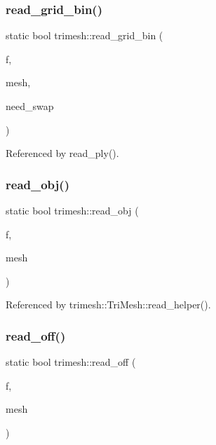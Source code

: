 \mbox{\label{namespacetrimesh_a7a92c66194fd0ddb7aecee23de456f23}} 
\subsubsection{\texorpdfstring{read\+\_\+grid\+\_\+bin()}{read\_grid\_bin()}}
{\footnotesize\ttfamily static bool trimesh\+::read\+\_\+grid\+\_\+bin (\begin{DoxyParamCaption}\item[{F\+I\+LE $\ast$}]{f,  }\item[{\hyperlink{classtrimesh_1_1TriMesh}{Tri\+Mesh} $\ast$}]{mesh,  }\item[{bool}]{need\+\_\+swap }\end{DoxyParamCaption})\hspace{0.3cm}{\ttfamily [static]}}



Referenced by read\+\_\+ply().

\mbox{\label{namespacetrimesh_a6f5afaf75436495bf724248ceba4eab7}} 
\subsubsection{\texorpdfstring{read\+\_\+obj()}{read\_obj()}}
{\footnotesize\ttfamily static bool trimesh\+::read\+\_\+obj (\begin{DoxyParamCaption}\item[{F\+I\+LE $\ast$}]{f,  }\item[{\hyperlink{classtrimesh_1_1TriMesh}{Tri\+Mesh} $\ast$}]{mesh }\end{DoxyParamCaption})\hspace{0.3cm}{\ttfamily [static]}}



Referenced by trimesh\+::\+Tri\+Mesh\+::read\+\_\+helper().

\mbox{\label{namespacetrimesh_ace7124de1320b844bbf3f353f6dfab9a}} 
\subsubsection{\texorpdfstring{read\+\_\+off()}{read\_off()}}
{\footnotesize\ttfamily static bool trimesh\+::read\+\_\+off (\begin{DoxyParamCaption}\item[{F\+I\+LE $\ast$}]{f,  }\item[{\hyperlink{classtrimesh_1_1TriMesh}{Tri\+Mesh} $\ast$}]{mesh }\end{DoxyParamCaption})\hspace{0.3cm}{\ttfamily [static]}}



